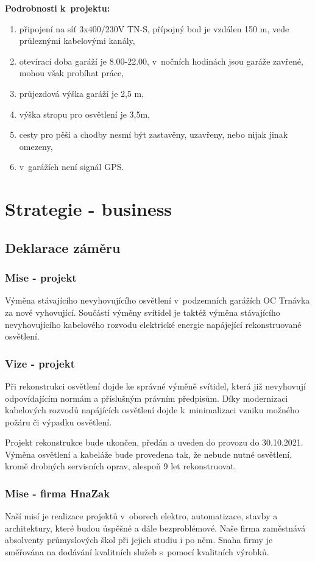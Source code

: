 \documentclass[a4paper, twoside, 11pt]{article}
\begin{document}
			\noindent \textbf{Podrobnosti k~projektu:}
				\begin{enumerate}
					\item připojení na síť 3x400/230V TN-S, přípojný bod je vzdálen 150 m, vede průleznými kabelovými kanály,
					\item otevírací doba garáží je 8.00-22.00, v~nočních hodinách jsou garáže zavřené, mohou však probíhat práce,
					\item průjezdová výška garáží je 2,5 m,
					\item výška stropu pro osvětlení je 3,5m,
					\item cesty pro pěší a chodby nesmí být zastavěny, uzavřeny, nebo nijak jinak omezeny,
					\item v~garážích není signál GPS.
				\end{enumerate}
\section{Strategie - business}
	\subsection{Deklarace záměru}
		\subsubsection{Mise - projekt}
		Výměna stávajícího nevyhovujícího osvětlení v~podzemních garážích OC Trnávka za nové vyhovující. Součástí výměny svítidel je taktéž výměna stávajícího nevyhovujícího kabelového rozvodu elektrické energie napájející rekonstruované osvětlení.
		\subsubsection{Vize - projekt}
		Při rekonstrukci osvětlení dojde ke správné výměně svítidel, která již nevyhovují odpovídajícím normám a příslušným právním předpisům. Díky modernizaci kabelových rozvodů napájících osvětlení dojde k~minimalizaci vzniku možného požáru či výpadku osvětlení.\par
		Projekt rekonstrukce bude ukončen, předán a uveden do provozu do 30.10.2021. Výměna osvětlení a kabeláže bude provedena tak, že nebude nutné osvětlení, kromě drobných servisních oprav, alespoň 9 let rekonstruovat.
		\subsubsection{Mise - firma HnaZak}
		Naší misí je realizace projektů v~oborech elektro, automatizace, stavby a architektury, které budou úspěšné a dále bezproblémové. Naše firma zaměstnává absolventy průmyslových škol při jejich studiu i po něm. Snaha firmy je směřována na dodávání kvalitních služeb s~pomocí kvalitních výrobků.
		
\end{document}
